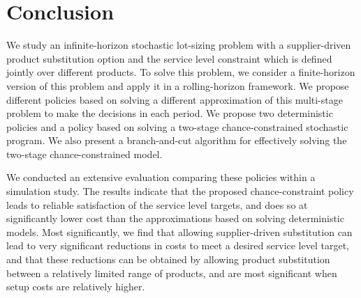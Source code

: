 \documentclass[msom]{oo}
\begin{document}





\section{Conclusion}
\label{sec:conc}

We study an infinite-horizon stochastic lot-sizing problem with a supplier-driven product substitution option and the service level constraint which is defined jointly over different products. To solve this problem, we consider a finite-horizon version of this problem and apply it in a rolling-horizon framework. We propose different policies based on solving a different approximation of this multi-stage problem to make the decisions in each period.  We propose two deterministic policies and a policy based on solving a two-stage chance-constrained stochastic program. We also present a branch-and-cut algorithm for effectively solving the two-stage chance-constrained model. 

We conducted an extensive evaluation comparing these policies within a simulation study. The results indicate that the proposed chance-constraint policy leads to reliable satisfaction of the service level targets, and does so at significantly lower cost than the approximations based on solving deterministic models. Most significantly, we find that allowing supplier-driven substitution can lead to very significant reductions in costs to meet a desired service level target, and that these reductions can be obtained by allowing product substitution between a relatively limited range of products, and are most significant when setup costs are relatively higher.
\end{document}
